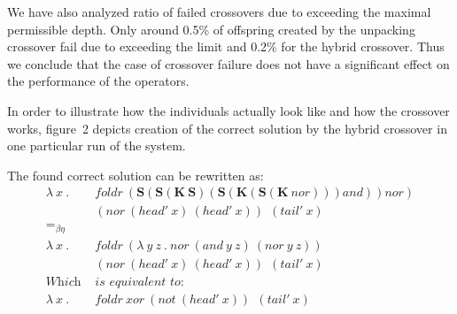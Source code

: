 \documentclass{sig-alternate}
\newcommand{\Scomb }{\mathbf{S}}
\newcommand{\Kcomb }{\mathbf{K}}
\newcommand{\beeq}{=_{\beta\eta}}
\newcommand{\red}[1]{{\color{red} #1}}
\begin{document}
We have also analyzed ratio of failed crossovers due to exceeding the maximal permissible depth. Only around 0.5\% of offspring created by the unpacking crossover fail due to exceeding the limit and 0.2\% for the hybrid crossover. Thus we conclude that the case of crossover failure does not have a significant effect on the performance of the operators.


In order to illustrate how the individuals actually look like and how the crossover works, figure~2 depicts creation of the correct solution by the hybrid crossover in one particular run of the system. 

The found correct solution can be rewritten as: 
\begin{align*}
\lambda~x~.~&foldr~(\Scomb(\Scomb (\Kcomb~\Scomb) (\Scomb (\Kcomb (\Scomb  (\Kcomb~nor) ) ) and) ) nor )  \\
 & (nor~(head'~x)~(head'~x))~ ~(tail'~x)\\
 \beeq & \\
\lambda~x~.~&foldr~(\lambda~y~z~.~nor~(and~y~z)~(nor~y~z)  )\\
 & (nor~(head'~x)~(head'~x))~ ~(tail'~x)\\
 \textit{Which~} & \textit{is equivalent to:}\\
\lambda~x~.~&foldr~xor~(not~(head'~x))~ ~(tail'~x) 
\end{align*}
\end{document}
